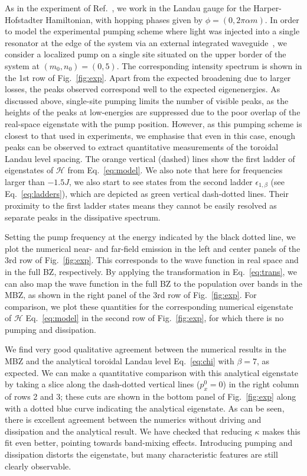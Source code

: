 As in the experiment of Ref.~\cite{hafezi2013imaging}, we work in the
Landau gauge for the Harper-Hofstadter Hamiltonian, with hopping
phases given by $\phi = (0, 2\pi\alpha m)$. In order to model the
experimental pumping scheme where light was injected into a single
resonator at the edge of the system via an external integrated
waveguide~\cite{hafezi2013imaging}, we consider a localized pump on a
single site situated on the upper border of the system at
$(m_0,n_0)= (0,5)$.  The corresponding intensity spectrum is shown in
the 1st row of Fig.~\ref{fig:exp}. Apart from the expected broadening
due to larger losses, the peaks observed correspond well to the
expected eigenenergies.  As discussed above, single-site pumping
limits the number of visible peaks, as the heights of the peaks at
low-energies are suppressed due to the poor overlap of the real-space
eigenstate with the pump position. However, as this pumping scheme is
closest to that used in experiments, we emphasise that even in this
case, enough peaks can be observed to extract quantitative
measurements of the toroidal Landau level spacing. The orange vertical
(dashed) lines show the first ladder of eigenstates of $\mathcal{H}$
from Eq.~\eqref{eq:model}. We also note that here for frequencies
larger than $-1.5 J$, we also start to see states from the second
ladder $\epsilon_{1,\beta}$ (see Eq.~\eqref{eq:ladders}), which are
depicted as green vertical dash-dotted lines. Their proximity to the
first ladder states means they cannot be easily resolved as separate
peaks in the dissipative spectrum.

Setting the pump frequency at the energy indicated by the black dotted
line, we plot the numerical near- and far-field emission in the left
and center panels of the 3rd row of Fig.~\ref{fig:exp}. This
corresponds to the wave function in real space and in the full BZ,
respectively. By applying the transformation in Eq.~\eqref{eq:trans}, we
can also map the wave function in the full BZ to the population over
bands in the MBZ, as shown in the right panel of the 3rd row of
Fig.~\ref{fig:exp}. For comparison, we plot these quantities for the
corresponding numerical eigenstate of $\mathcal{H}$
Eq.~\eqref{eq:model} in the second row of Fig.~\ref{fig:exp}, for
which there is no pumping and dissipation.

We find very good qualitative agreement between the numerical results
in the MBZ and the analytical toroidal Landau level Eq.~\eqref{eq:chi}
with $\beta=7$, as expected. We can make a quantitative comparison with
this analytical eigenstate by taking a slice along the dash-dotted
vertical lines ($p_x^0 = 0$) in the right column of rows 2 and 3;
these cuts are shown in the bottom panel of Fig.~\ref{fig:exp} along
with a dotted blue curve indicating the analytical eigenstate. As can
be seen, there is excellent agreement between the numerics without
driving and dissipation and the analytical result. We have checked
that reducing $\kappa$ makes this fit even better, pointing towards
band-mixing effects. Introducing pumping and dissipation distorts the
eigenstate, but many characteristic features are still clearly
observable.

